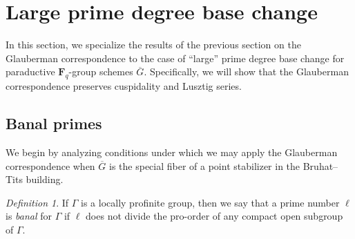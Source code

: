 \documentclass[reqno]{amsart}
\numberwithin{equation}{subsection}
\newcommand{\F}{\mathbf{F}}
\newcommand{\ol}[1]{\overline{#1}}
\theoremstyle{remark}
\newtheorem{defn}[thm]{Definition}
\numberwithin{equation}{subsection}
\numberwithin{figure}{subsection}
\begin{document}
\section{Large prime degree base change}\label{sec:large-prime-degree-base-change}

In this section, we specialize the results of the previous section on the Glauberman correspondence to the case of ``large'' prime degree base change for paraductive $\F_q$-group schemes $\ol G$. Specifically, we will show that the Glauberman correspondence preserves cuspidality and Lusztig series.


\subsection{Banal primes}

We begin by analyzing conditions under which we may apply the Glauberman correspondence when $\ol G$ is the special fiber of a point stabilizer in the Bruhat--Tits building.

\begin{defn}\label{def:banal-prime}
If $\Gamma$ is a locally profinite group, then we say that a prime number $\ell$ is \emph{banal} for $\Gamma$ if $\ell$ does not divide the pro-order of any compact open subgroup of $\Gamma$.
\end{defn}
\end{document}
